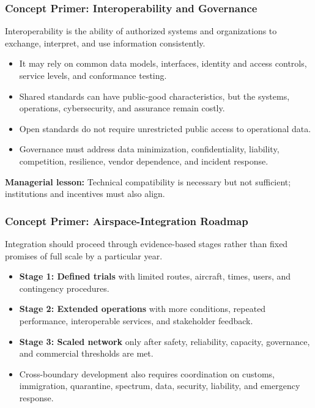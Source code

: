 \documentclass{beamer}
\begin{document}
\begin{frame}[t]
\frametitle{Concept Primer: Interoperability and Governance}
Interoperability is the ability of authorized systems and organizations to exchange, interpret, and use information consistently.
\begin{itemize}
\item It may rely on common data models, interfaces, identity and access controls, service levels, and conformance testing.
\item Shared standards can have public-good characteristics, but the systems, operations, cybersecurity, and assurance remain costly.
\item Open standards do not require unrestricted public access to operational data.
\item Governance must address data minimization, confidentiality, liability, competition, resilience, vendor dependence, and incident response.
\end{itemize}
\textbf{Managerial lesson:} Technical compatibility is necessary but not sufficient; institutions and incentives must also align.
\end{frame}





\begin{frame}[t]
\frametitle{Concept Primer: Airspace-Integration Roadmap}
Integration should proceed through evidence-based stages rather than fixed promises of full scale by a particular year.
\begin{itemize}
\item \textbf{Stage 1: Defined trials} with limited routes, aircraft, times, users, and contingency procedures.
\item \textbf{Stage 2: Extended operations} with more conditions, repeated performance, interoperable services, and stakeholder feedback.
\item \textbf{Stage 3: Scaled network} only after safety, reliability, capacity, governance, and commercial thresholds are met.
\item Cross-boundary development also requires coordination on customs, immigration, quarantine, spectrum, data, security, liability, and emergency response.
\end{itemize}
\end{frame}
\end{document}
